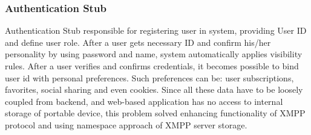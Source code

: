     \subsubsection{Authentication Stub}
    Authentication Stub responsible for registering user in system, providing User ID and define user role. After a user gets necessary ID and confirm his/her personality by using password and name, system automatically applies visibility rules. After a user verifies and confirms credentials, it becomes possible to bind user id with personal preferences. Such preferences can be: user subscriptions, favorites, social sharing and even cookies. Since all these data have to be loosely coupled from backend, and web-based application has no access to internal storage of portable device, this problem solved enhancing functionality of XMPP protocol and using namespace approach of XMPP server storage.

